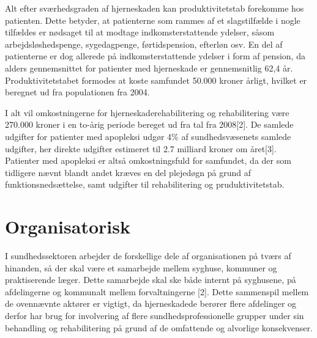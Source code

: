 Alt efter sværhedsgraden af hjerneskaden kan produktivitetstab forekomme hos patienten. Dette betyder, at patienterne som rammes af et slagstilfælde %
 i nogle tilfældes er nødsaget til at modtage indkomsterstattende ydelser, såsom arbejdsløshedspenge, sygedagpenge, førtidspension, efterløn osv. En del af patienterne er dog allerede på indkomsterstattende ydelser i form af pension, da alders gennemsnittet for patienter med hjerneskade er gennemsnitlig 62,4 år. Produktivitetstabet formodes at koste samfundet 50.000 kroner årligt, hvilket er beregnet ud fra populationen fra 2004. 


I alt vil omkostningerne for hjerneskaderehabilitering og rehabilitering være 270.000 kroner i en to-årig periode bereget ud fra tal fra 2008[2]. De samlede udgifter for patienter med apopleksi udgør 4\% af sundhedsvæsenets samlede udgifter, her direkte udgifter estimeret til 2.7 milliard kroner om året[3]. 
Patienter med apopleksi er altså omkostningsfuld for samfundet, da der som tidligere nævnt blandt andet kræves en del plejedøgn på grund af funktionsnedsættelse, samt udgifter til rehabilitering og pruduktivitetstab.


\section{Organisatorisk}
I sundhedssektoren arbejder de forskellige dele af organisationen på tværs af hinanden, så der skal være et samarbejde mellem syghuse, kommuner og praktiserende læger. Dette samarbejde skal ske både internt på syghusene, på afdelingerne og kommunalt mellem forvaltningerne [2]. Dette sammenspil mellem de ovennævnte aktører er vigtigt, da hjerneskadede berører flere afdelinger og derfor har brug for involvering af flere sundhedsprofessionelle grupper under sin behandling og rehabilitering på grund af de omfattende og alvorlige konsekvenser.
 
